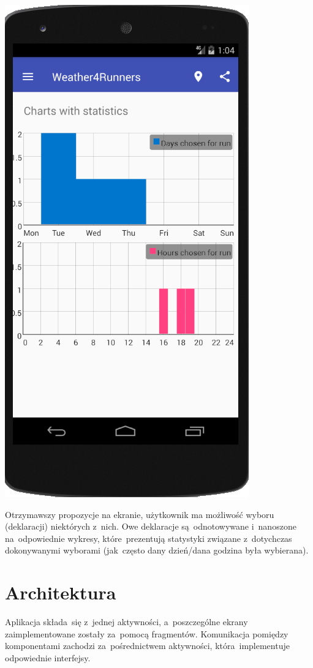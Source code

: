 \documentclass[11pt, a4paper, oneside]{scrartcl}
\begin{document}
\begin{center}
\includegraphics[scale=0.7]{screen_stats.png}
\end{center}

Otrzymawszy propozycje na ekranie, użytkownik ma możliwość wyboru (deklaracji) niektórych z~nich. Owe deklaracje są~odnotowywane
i~nanoszone na~odpowiednie wykresy, które~prezentują statystyki związane z~dotychczas dokonywanymi wyborami (jak~często dany dzień/dana godzina była wybierana).

\section{Architektura}
Aplikacja składa~się z~jednej aktywności, a~poszczególne ekrany zaimplementowane zostały za~pomocą fragmentów. Komunikacja pomiędzy komponentami
zachodzi za~pośrednictwem aktywności, która~implementuje odpowiednie interfejsy.
\end{document}

